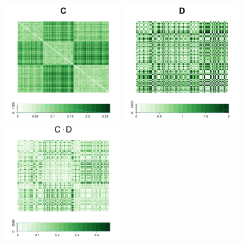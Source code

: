 \documentclass[12pt]{article}
\theoremstyle{definition}
\begin{document}
\begin{figure}[H]
	\centering
	\includegraphics[width=2in]{../Figure/C.png}
	\includegraphics[width=2in]{../Figure/D.png}
	\includegraphics[width=2in]{../Figure/CD.png}
		

\end{figure}
\end{document}
